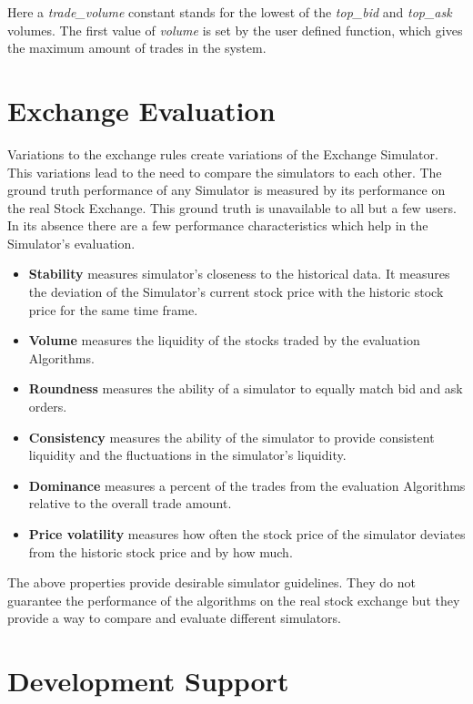 \documentclass{article}
\begin{document}
Here a \emph{trade\_volume} constant stands for the lowest of the \emph{top\_bid} and \emph{top\_ask} volumes. The first value of \emph{volume} is set by the user defined function, which gives the maximum amount of trades in the system.

\section{Exchange Evaluation}

Variations to the exchange rules create variations of the Exchange Simulator. This variations lead to the need to compare the simulators to each other. The ground truth performance of any Simulator is measured by its performance on the real Stock Exchange. This ground truth is unavailable to all but a few users. In its absence there are a few performance characteristics which help in the Simulator's evaluation.

\begin{itemize}
    \item {\bf Stability} measures simulator's closeness to the historical data. It measures the deviation of the Simulator's current stock price with the historic stock price for the same time frame. 
    \item {\bf Volume} measures the liquidity of the stocks traded by the evaluation Algorithms. 
    \item {\bf Roundness} measures the ability of a simulator to equally match bid and ask orders. 
    \item {\bf Consistency} measures the ability of the simulator to provide consistent liquidity and the fluctuations in the simulator's liquidity. 
    \item {\bf Dominance} measures a percent of the trades from the evaluation Algorithms relative to the overall trade amount. 
    \item {\bf Price volatility} measures how often the stock price of the simulator deviates from the historic stock price and by how much.
\end{itemize}

The above properties provide desirable simulator guidelines. They do not guarantee the performance of the algorithms on the real stock exchange but they provide a way to compare and evaluate different simulators.

\section{Development Support}
\end{document}
